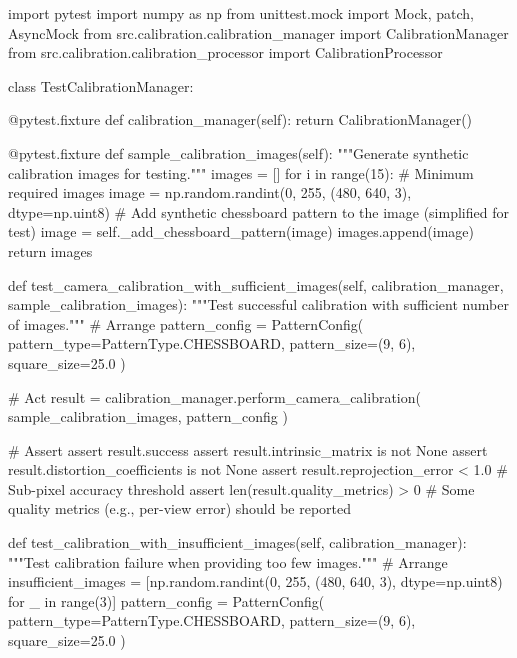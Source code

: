     import pytest
    import numpy as np
    from unittest.mock import Mock, patch, AsyncMock
    from src.calibration.calibration_manager import CalibrationManager
    from src.calibration.calibration_processor import CalibrationProcessor

    class TestCalibrationManager:

        @pytest.fixture
        def calibration_manager(self):
            return CalibrationManager()

        @pytest.fixture
        def sample_calibration_images(self):
            """Generate synthetic calibration images for testing."""
            images = []
            for i in range(15):  # Minimum required images
                image = np.random.randint(0, 255, (480, 640, 3), dtype=np.uint8)
                # Add synthetic chessboard pattern to the image (simplified for test)
                image = self._add_chessboard_pattern(image)
                images.append(image)
            return images

        def test_camera_calibration_with_sufficient_images(self, calibration_manager, sample_calibration_images):
            """Test successful calibration with sufficient number of images."""
            # Arrange
            pattern_config = PatternConfig(
                pattern_type=PatternType.CHESSBOARD,
                pattern_size=(9, 6),
                square_size=25.0
            )

            # Act
            result = calibration_manager.perform_camera_calibration(
                sample_calibration_images, 
                pattern_config
            )

            # Assert
            assert result.success
            assert result.intrinsic_matrix is not None
            assert result.distortion_coefficients is not None
            assert result.reprojection_error < 1.0  # Sub-pixel accuracy threshold
            assert len(result.quality_metrics) > 0   # Some quality metrics (e.g., per-view error) should be reported

        def test_calibration_with_insufficient_images(self, calibration_manager):
            """Test calibration failure when providing too few images."""
            # Arrange
            insufficient_images = [np.random.randint(0, 255, (480, 640, 3), dtype=np.uint8) for _ in range(3)]
            pattern_config = PatternConfig(
                pattern_type=PatternType.CHESSBOARD,
                pattern_size=(9, 6),
                square_size=25.0
            )

